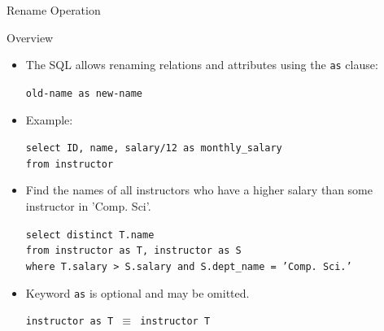 \documentclass[aspectratio=169, xcolor=dvipsnames]{beamer}
\begin{document}
\begin{frame}{Rename Operation}
    \begin{block}{Overview}
        \begin{itemize}[<+->]
            \item The SQL allows renaming relations and attributes using the \texttt{as} clause:
            \begin{center}
                \texttt{old-name as new-name}
            \end{center}
            \item Example:
            \begin{center}
                \texttt{select ID, name, salary/12 as monthly\_salary \\
                        from instructor}
            \end{center}
            \item Find the names of all instructors who have a higher salary than some instructor in 'Comp. Sci'.
            \begin{center}
                \texttt{select distinct T.name \\
                        from instructor as T, instructor as S \\
                        where T.salary > S.salary and S.dept\_name = 'Comp. Sci.'}
            \end{center}
            \item Keyword \texttt{as} is optional and may be omitted.
            \begin{center}
                \texttt{instructor as T $\equiv$ instructor T}
            \end{center}
        \end{itemize}
    \end{block}
\end{frame}
\end{document}
